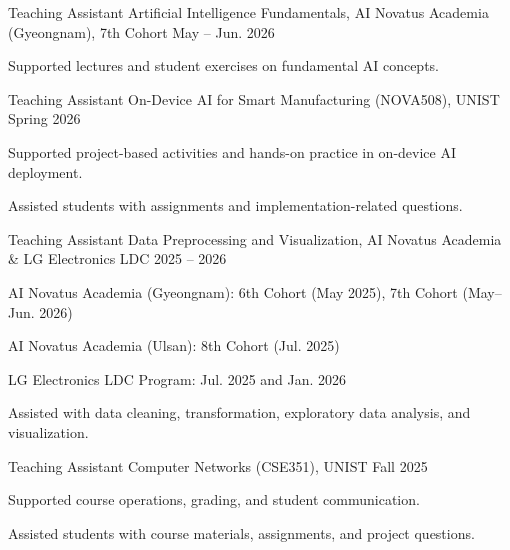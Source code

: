 \documentclass[11pt, a4paper]{awesome-cv}
\begin{document}
\begin{cventries}
  \cventry
    {Teaching Assistant}
    {Artificial Intelligence Fundamentals, AI Novatus Academia (Gyeongnam), 7th Cohort}
    {}
    {May -- Jun. 2026}
    {
      \begin{cvitems}
        \item {Supported lectures and student exercises on fundamental AI concepts.}
      \end{cvitems}
    }
  \cventry
    {Teaching Assistant}
    {On-Device AI for Smart Manufacturing (NOVA508), UNIST}
    {}
    {Spring 2026}
    {
      \begin{cvitems}
        \item {Supported project-based activities and hands-on practice in on-device AI deployment.}
        \item {Assisted students with assignments and implementation-related questions.}
      \end{cvitems}
    }
  \cventry
    {Teaching Assistant}
    {Data Preprocessing and Visualization, AI Novatus Academia \& LG Electronics LDC}
    {}
    {2025 -- 2026}
    {
      \begin{cvitems}
        \item {AI Novatus Academia (Gyeongnam): 6th Cohort (May 2025), 7th Cohort (May--Jun. 2026)}
        \item {AI Novatus Academia (Ulsan): 8th Cohort (Jul. 2025)}
        \item {LG Electronics LDC Program: Jul. 2025 and Jan. 2026}
        \item {Assisted with data cleaning, transformation, exploratory data analysis, and visualization.}
      \end{cvitems}
    }
  \cventry
    {Teaching Assistant}
    {Computer Networks (CSE351), UNIST}
    {}
    {Fall 2025}
    {
      \begin{cvitems}
        \item {Supported course operations, grading, and student communication.}
        \item {Assisted students with course materials, assignments, and project questions.}
      \end{cvitems}
    }
\end{cventries}
\end{document}
